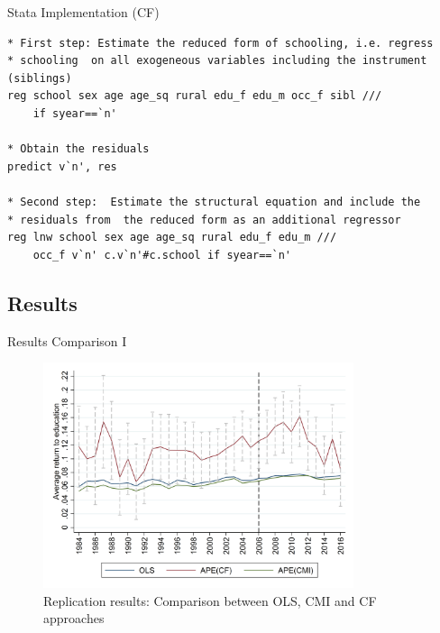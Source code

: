 \documentclass[10pt,ignorenonframetext,]{beamer}
\begin{document}
\begin{frame}[fragile]{Stata Implementation (CF)}
\protect\hypertarget{stata-implementation-cf}{}

\footnotesize

\begin{verbatim}
* First step: Estimate the reduced form of schooling, i.e. regress
* schooling  on all exogeneous variables including the instrument (siblings)
reg school sex age age_sq rural edu_f edu_m occ_f sibl ///
    if syear==`n'

* Obtain the residuals
predict v`n', res

* Second step:  Estimate the structural equation and include the
* residuals from  the reduced form as an additional regressor
reg lnw school sex age age_sq rural edu_f edu_m ///
    occ_f v`n' c.v`n'#c.school if syear==`n'
\end{verbatim}

\normalsize

\end{frame}

\hypertarget{results}{%
\subsection{Results}\label{results}}

\begin{frame}{Results Comparison I}
\protect\hypertarget{results-comparison-i}{}

\begin{figure}
\centering
\includegraphics[width=\textwidth,height=2.60417in]{img/results.png}
\caption{Replication results: Comparison between OLS, CMI and CF
approaches}
\end{figure}

\end{frame}
\end{document}
